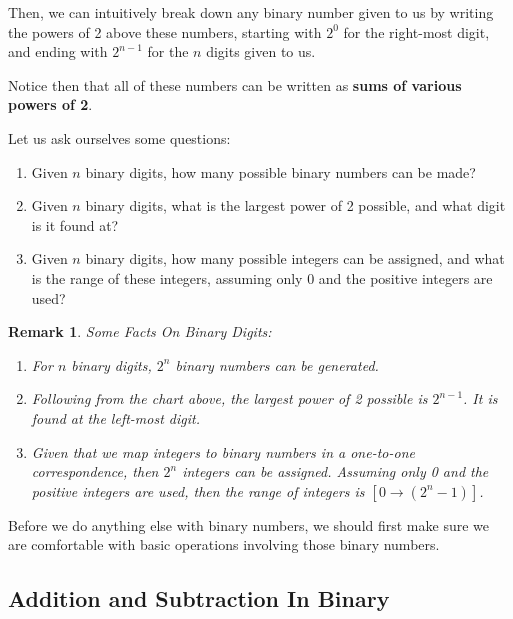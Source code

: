 \documentclass[12pt]{article}
\newtheorem*{remark}
{Remark}
\begin{document}
    Then, we can intuitively break down any binary number given to us by writing
    the powers of 2 above these numbers, starting with $2^0$ for the right-most digit,
    and ending with $2^{n - 1}$ for the $n$ digits given to us.

    Notice then that all of these numbers can be written as \textbf{sums of various powers of 2}.

    Let us ask ourselves some questions:

    \begin{enumerate}
        \item Given $n$ binary digits, how many possible binary numbers can be made?
        \item Given $n$ binary digits, what is the largest power of 2 possible, and what digit
        is it found at?
        \item Given $n$ binary digits, how many possible integers can be assigned, and what
        is the range of these integers, assuming only 0 and the positive integers are used?
    \end{enumerate}
    

    \begin{remark} Some Facts On Binary Digits:
            \begin{enumerate}
                \item For $n$ binary digits, $2^n$ binary numbers can be generated.
                \item Following from the chart above, the largest power of 2 possible is
                $2^{n - 1}$. It is found at the left-most digit.
                \item Given that we map integers to binary numbers in a one-to-one correspondence,
                then $2^n$ integers can be assigned. Assuming only 0 and the positive integers are used,
                then the range of integers is $[0 \rightarrow (2^{n} - 1)]$.
            \end{enumerate}
        \end{remark}


        
Before we do anything else with binary numbers, we should first make sure we are comfortable with
basic operations involving those binary numbers.

\subsection{Addition and Subtraction In Binary}
\end{document}
